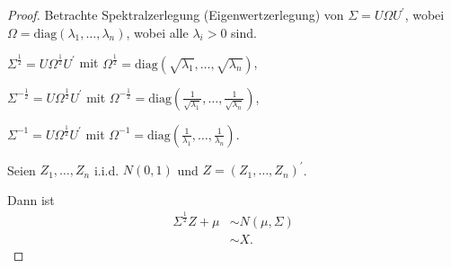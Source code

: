 \documentclass{tstextbook}
\begin{document}
\begin{proof}
	Betrachte Spektralzerlegung (Eigenwertzerlegung) von $ \Sigma = U\Omega U^\prime $, wobei $ \Omega = \text{diag} \left(\lambda_1,\ldots,\lambda_n \right) $, wobei alle $ \lambda_i > 0 $ sind.
	
	$ \Sigma^{\frac{1}{2}} = U\Omega^{\frac{1}{2}} U^\prime $ mit $ \Omega^{\frac{1}{2}} = \text{diag} \left(\sqrt{\lambda_1},\ldots,\sqrt{\lambda_n} \right) $,
	
	$ \Sigma^{- \frac{1}{2}} = U\Omega^{\frac{1}{2}} U^\prime $ mit $ \Omega^{- \frac{1}{2}} = \text{diag} \left(\frac{1}{\sqrt{\lambda_1}},\ldots,\frac{1}{\sqrt{\lambda_n}} \right) $,
	
	$ \Sigma^{-1} = U\Omega^{\frac{1}{2}} U^\prime $ mit $ \Omega^{-1} = \text{diag} \left(\frac{1}{\lambda_1},\ldots,\frac{1}{\lambda_n} \right) $.
	
	Seien $ Z_1,\ldots,Z_n $ i.i.d. $ N(0,1) $ und $ Z=\left(Z_1,\ldots,Z_n\right)^\prime $.
	
	Dann ist \[ \begin{aligned}
		\Sigma^\frac{1}{2} Z + \mu &\sim N(\mu, \Sigma) \\
		&\sim X. 
	\end{aligned}
	\] 
	

\end{proof}
\end{document}
